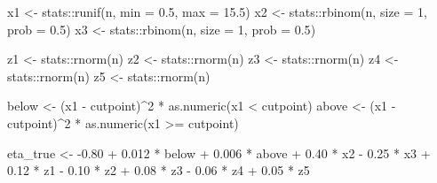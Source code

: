 \documentclass[
  english,
  letterpaper,
  DIV=11,
  numbers=noendperiod]{scrartcl}
\newenvironment{Shaded}{\begin{snugshade}}{\end{snugshade}}
\newcommand{\AttributeTok}[1]{\textcolor[rgb]{0.40,0.45,0.13}{#1}}
\newcommand{\DecValTok}[1]{\textcolor[rgb]{0.68,0.00,0.00}{#1}}
\newcommand{\FloatTok}[1]{\textcolor[rgb]{0.68,0.00,0.00}{#1}}
\newcommand{\FunctionTok}[1]{\textcolor[rgb]{0.28,0.35,0.67}{#1}}
\newcommand{\NormalTok}[1]{\textcolor[rgb]{0.00,0.23,0.31}{#1}}
\newcommand{\OtherTok}[1]{\textcolor[rgb]{0.00,0.23,0.31}{#1}}
\newcommand{\SpecialCharTok}[1]{\textcolor[rgb]{0.37,0.37,0.37}{#1}}
\begin{document}
\begin{Shaded}
\begin{Highlighting}[]
\NormalTok{  x1 }\OtherTok{\textless{}{-}}\NormalTok{ stats}\SpecialCharTok{::}\FunctionTok{runif}\NormalTok{(n, }\AttributeTok{min =} \FloatTok{0.5}\NormalTok{, }\AttributeTok{max =} \FloatTok{15.5}\NormalTok{)}
\NormalTok{  x2 }\OtherTok{\textless{}{-}}\NormalTok{ stats}\SpecialCharTok{::}\FunctionTok{rbinom}\NormalTok{(n, }\AttributeTok{size =} \DecValTok{1}\NormalTok{, }\AttributeTok{prob =} \FloatTok{0.5}\NormalTok{)}
\NormalTok{  x3 }\OtherTok{\textless{}{-}}\NormalTok{ stats}\SpecialCharTok{::}\FunctionTok{rbinom}\NormalTok{(n, }\AttributeTok{size =} \DecValTok{1}\NormalTok{, }\AttributeTok{prob =} \FloatTok{0.5}\NormalTok{)}

\NormalTok{  z1 }\OtherTok{\textless{}{-}}\NormalTok{ stats}\SpecialCharTok{::}\FunctionTok{rnorm}\NormalTok{(n)}
\NormalTok{  z2 }\OtherTok{\textless{}{-}}\NormalTok{ stats}\SpecialCharTok{::}\FunctionTok{rnorm}\NormalTok{(n)}
\NormalTok{  z3 }\OtherTok{\textless{}{-}}\NormalTok{ stats}\SpecialCharTok{::}\FunctionTok{rnorm}\NormalTok{(n)}
\NormalTok{  z4 }\OtherTok{\textless{}{-}}\NormalTok{ stats}\SpecialCharTok{::}\FunctionTok{rnorm}\NormalTok{(n)}
\NormalTok{  z5 }\OtherTok{\textless{}{-}}\NormalTok{ stats}\SpecialCharTok{::}\FunctionTok{rnorm}\NormalTok{(n)}

\NormalTok{  below }\OtherTok{\textless{}{-}}\NormalTok{ (x1 }\SpecialCharTok{{-}}\NormalTok{ cutpoint)}\SpecialCharTok{\^{}}\DecValTok{2} \SpecialCharTok{*} \FunctionTok{as.numeric}\NormalTok{(x1 }\SpecialCharTok{\textless{}}\NormalTok{ cutpoint)}
\NormalTok{  above }\OtherTok{\textless{}{-}}\NormalTok{ (x1 }\SpecialCharTok{{-}}\NormalTok{ cutpoint)}\SpecialCharTok{\^{}}\DecValTok{2} \SpecialCharTok{*} \FunctionTok{as.numeric}\NormalTok{(x1 }\SpecialCharTok{\textgreater{}=}\NormalTok{ cutpoint)}

\NormalTok{  eta\_true }\OtherTok{\textless{}{-}} \SpecialCharTok{{-}}\FloatTok{0.80} \SpecialCharTok{+}
    \FloatTok{0.012} \SpecialCharTok{*}\NormalTok{ below }\SpecialCharTok{+}
    \FloatTok{0.006} \SpecialCharTok{*}\NormalTok{ above }\SpecialCharTok{+}
    \FloatTok{0.40} \SpecialCharTok{*}\NormalTok{ x2 }\SpecialCharTok{{-}}
    \FloatTok{0.25} \SpecialCharTok{*}\NormalTok{ x3 }\SpecialCharTok{+}
    \FloatTok{0.12} \SpecialCharTok{*}\NormalTok{ z1 }\SpecialCharTok{{-}}
    \FloatTok{0.10} \SpecialCharTok{*}\NormalTok{ z2 }\SpecialCharTok{+}
    \FloatTok{0.08} \SpecialCharTok{*}\NormalTok{ z3 }\SpecialCharTok{{-}}
    \FloatTok{0.06} \SpecialCharTok{*}\NormalTok{ z4 }\SpecialCharTok{+}
    \FloatTok{0.05} \SpecialCharTok{*}\NormalTok{ z5}


\end{Highlighting}
\end{Shaded}
\end{document}
